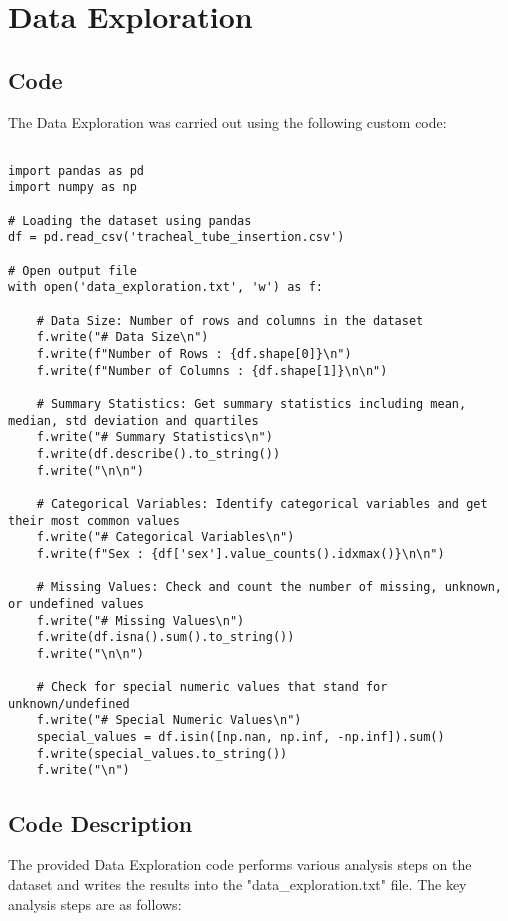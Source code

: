 \documentclass[11pt]{article}
\begin{document}
\section{Data Exploration}
\subsection{{Code}}
The Data Exploration was carried out using the following custom code:

\begin{verbatim}

import pandas as pd
import numpy as np

# Loading the dataset using pandas
df = pd.read_csv('tracheal_tube_insertion.csv')

# Open output file
with open('data_exploration.txt', 'w') as f:

    # Data Size: Number of rows and columns in the dataset
    f.write("# Data Size\n")
    f.write(f"Number of Rows : {df.shape[0]}\n")
    f.write(f"Number of Columns : {df.shape[1]}\n\n")

    # Summary Statistics: Get summary statistics including mean, median, std deviation and quartiles
    f.write("# Summary Statistics\n")
    f.write(df.describe().to_string())
    f.write("\n\n")

    # Categorical Variables: Identify categorical variables and get their most common values
    f.write("# Categorical Variables\n")
    f.write(f"Sex : {df['sex'].value_counts().idxmax()}\n\n")

    # Missing Values: Check and count the number of missing, unknown, or undefined values
    f.write("# Missing Values\n")
    f.write(df.isna().sum().to_string())
    f.write("\n\n")

    # Check for special numeric values that stand for unknown/undefined
    f.write("# Special Numeric Values\n")
    special_values = df.isin([np.nan, np.inf, -np.inf]).sum()
    f.write(special_values.to_string())
    f.write("\n")

\end{verbatim}

\subsection{Code Description}

The provided Data Exploration code performs various analysis steps on the dataset and writes the results into the "data\_exploration.txt" file. The key analysis steps are as follows:
\end{document}
